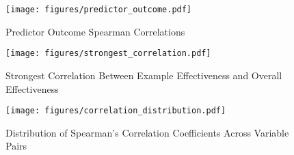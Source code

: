 \begin{figure}[htbp]
\centering
\texttt{[image: figures/predictor\_outcome.pdf]}
\caption{Predictor Outcome Spearman Correlations}
\label{figure:predictor_outcome}
\end{figure}

\begin{figure}[htbp]
\centering
\texttt{[image: figures/strongest\_correlation.pdf]}
\caption{Strongest Correlation Between Example Effectiveness and Overall Effectiveness}
\label{figure:strongest_correlation}
\end{figure}

\begin{figure}[htbp]
\centering
\texttt{[image: figures/correlation\_distribution.pdf]}
\caption{Distribution of Spearman's Correlation Coefficients Across Variable Pairs}
\label{figure:correlation_distribution}
\end{figure}